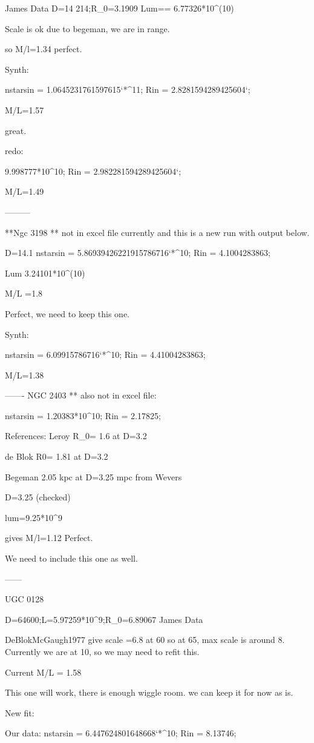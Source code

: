 James Data D=14 214;R_0=3.1909
Lum== 6.77326*10^(10)

Scale is ok due to begeman, we are in range.


so M/l=1.34 perfect.


Synth:

nstarsin = 1.0645231761597615`*^11;
Rin = 2.8281594289425604`;

M/L=1.57

great.

redo:

9.998777*10^10;
Rin = 2.982281594289425604`;

M/L=1.49


---------

**Ngc 3198 ** not in excel file currently and this is a new run with output below.


D=14.1
nstarsin = 5.86939426221915786716`*^10;
Rin = 4.1004283863;

Lum 3.24101*10^(10)

M/L =1.8 

Perfect, we need to keep this one.

Synth:

nstarsin = 6.09915786716`*^10;
Rin = 4.41004283863;

M/L=1.38

-------
NGC 2403  ** also not in excel file:

nstarsin = 1.20383*10^10;
Rin = 2.17825;

References:
Leroy R_0= 1.6 at D=3.2

de Blok R0= 1.81 at D=3.2

Begeman 2.05 kpc at D=3.25 mpc from Wevers

D=3.25 (checked)

lum=9.25*10^9

gives M/l=1.12  Perfect.

We need to include this one as well.

------

UGC 0128

D=64600;L=5.97259*10^9;R_0=6.89067 James Data

DeBlokMcGaugh1977 give scale =6.8 at 60 so at 65, max scale is around 8.  Currently we are at 10, so we may need to refit this.

Current M/L = 1.58

This one will work, there is enough wiggle room.  we can keep it for now as is.


New fit:

Our data:
nstarsin = 6.447624801648668`*^10;
Rin = 8.13746;


